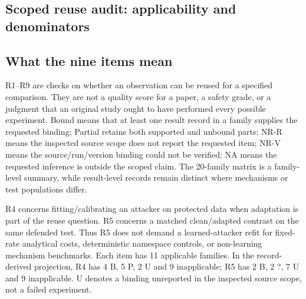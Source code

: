 \subsection{Scoped reuse audit: applicability and denominators}\label{sec:r8-sok-audit}

\subsection{What the nine items mean}
R1--R9 are checks on whether an observation can be reused for a specified comparison. They are not a quality score for a paper, a safety grade, or a judgment that an original study ought to have performed every possible experiment. Bound means that at least one result record in a family supplies the requested binding; Partial retains both supported and unbound parts; NR-R means the inspected source scope does not report the requested item; NR-V means the source/run/version binding could not be verified; NA means the requested inference is outside the scoped claim. The 20-family matrix is a family-level summary, while result-level records remain distinct where mechanisms or test populations differ.

R4 concerns fitting/calibrating an attacker on protected data when adaptation is part of the reuse question. R5 concerns a matched clean/adapted contrast on the same defended test. Thus R5 does not demand a learned-attacker refit for fixed-rate analytical costs, deterministic namespace controls, or non-learning mechanism benchmarks. Each item has 11 applicable families. In the record-derived projection, R4 has 4 B, 5 P, 2 U and 9 inapplicable; R5 has 2 B, 2 ?, 7 U and 9 inapplicable. U denotes a binding unreported in the inspected source scope, not a failed experiment.

